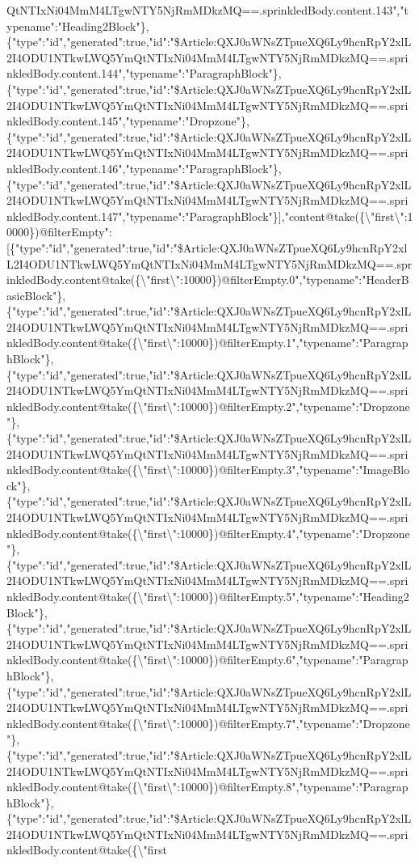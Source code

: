 QtNTIxNi04MmM4LTgwNTY5NjRmMDkzMQ==.sprinkledBody.content.143","typename":"Heading2Block"\},\{"type":"id","generated":true,"id":"\$Article:QXJ0aWNsZTpueXQ6Ly9hcnRpY2xlL2I4ODU1NTkwLWQ5YmQtNTIxNi04MmM4LTgwNTY5NjRmMDkzMQ==.sprinkledBody.content.144","typename":"ParagraphBlock"\},\{"type":"id","generated":true,"id":"\$Article:QXJ0aWNsZTpueXQ6Ly9hcnRpY2xlL2I4ODU1NTkwLWQ5YmQtNTIxNi04MmM4LTgwNTY5NjRmMDkzMQ==.sprinkledBody.content.145","typename":"Dropzone"\},\{"type":"id","generated":true,"id":"\$Article:QXJ0aWNsZTpueXQ6Ly9hcnRpY2xlL2I4ODU1NTkwLWQ5YmQtNTIxNi04MmM4LTgwNTY5NjRmMDkzMQ==.sprinkledBody.content.146","typename":"ParagraphBlock"\},\{"type":"id","generated":true,"id":"\$Article:QXJ0aWNsZTpueXQ6Ly9hcnRpY2xlL2I4ODU1NTkwLWQ5YmQtNTIxNi04MmM4LTgwNTY5NjRmMDkzMQ==.sprinkledBody.content.147","typename":"ParagraphBlock"\}{]},"content@take(\{\textbackslash{}"first\textbackslash{}":10000\})@filterEmpty":{[}\{"type":"id","generated":true,"id":"\$Article:QXJ0aWNsZTpueXQ6Ly9hcnRpY2xlL2I4ODU1NTkwLWQ5YmQtNTIxNi04MmM4LTgwNTY5NjRmMDkzMQ==.sprinkledBody.content@take(\{\textbackslash{}"first\textbackslash{}":10000\})@filterEmpty.0","typename":"HeaderBasicBlock"\},\{"type":"id","generated":true,"id":"\$Article:QXJ0aWNsZTpueXQ6Ly9hcnRpY2xlL2I4ODU1NTkwLWQ5YmQtNTIxNi04MmM4LTgwNTY5NjRmMDkzMQ==.sprinkledBody.content@take(\{\textbackslash{}"first\textbackslash{}":10000\})@filterEmpty.1","typename":"ParagraphBlock"\},\{"type":"id","generated":true,"id":"\$Article:QXJ0aWNsZTpueXQ6Ly9hcnRpY2xlL2I4ODU1NTkwLWQ5YmQtNTIxNi04MmM4LTgwNTY5NjRmMDkzMQ==.sprinkledBody.content@take(\{\textbackslash{}"first\textbackslash{}":10000\})@filterEmpty.2","typename":"Dropzone"\},\{"type":"id","generated":true,"id":"\$Article:QXJ0aWNsZTpueXQ6Ly9hcnRpY2xlL2I4ODU1NTkwLWQ5YmQtNTIxNi04MmM4LTgwNTY5NjRmMDkzMQ==.sprinkledBody.content@take(\{\textbackslash{}"first\textbackslash{}":10000\})@filterEmpty.3","typename":"ImageBlock"\},\{"type":"id","generated":true,"id":"\$Article:QXJ0aWNsZTpueXQ6Ly9hcnRpY2xlL2I4ODU1NTkwLWQ5YmQtNTIxNi04MmM4LTgwNTY5NjRmMDkzMQ==.sprinkledBody.content@take(\{\textbackslash{}"first\textbackslash{}":10000\})@filterEmpty.4","typename":"Dropzone"\},\{"type":"id","generated":true,"id":"\$Article:QXJ0aWNsZTpueXQ6Ly9hcnRpY2xlL2I4ODU1NTkwLWQ5YmQtNTIxNi04MmM4LTgwNTY5NjRmMDkzMQ==.sprinkledBody.content@take(\{\textbackslash{}"first\textbackslash{}":10000\})@filterEmpty.5","typename":"Heading2Block"\},\{"type":"id","generated":true,"id":"\$Article:QXJ0aWNsZTpueXQ6Ly9hcnRpY2xlL2I4ODU1NTkwLWQ5YmQtNTIxNi04MmM4LTgwNTY5NjRmMDkzMQ==.sprinkledBody.content@take(\{\textbackslash{}"first\textbackslash{}":10000\})@filterEmpty.6","typename":"ParagraphBlock"\},\{"type":"id","generated":true,"id":"\$Article:QXJ0aWNsZTpueXQ6Ly9hcnRpY2xlL2I4ODU1NTkwLWQ5YmQtNTIxNi04MmM4LTgwNTY5NjRmMDkzMQ==.sprinkledBody.content@take(\{\textbackslash{}"first\textbackslash{}":10000\})@filterEmpty.7","typename":"Dropzone"\},\{"type":"id","generated":true,"id":"\$Article:QXJ0aWNsZTpueXQ6Ly9hcnRpY2xlL2I4ODU1NTkwLWQ5YmQtNTIxNi04MmM4LTgwNTY5NjRmMDkzMQ==.sprinkledBody.content@take(\{\textbackslash{}"first\textbackslash{}":10000\})@filterEmpty.8","typename":"ParagraphBlock"\},\{"type":"id","generated":true,"id":"\$Article:QXJ0aWNsZTpueXQ6Ly9hcnRpY2xlL2I4ODU1NTkwLWQ5YmQtNTIxNi04MmM4LTgwNTY5NjRmMDkzMQ==.sprinkledBody.content@take(\{\textbackslash{}"first\textbacks
